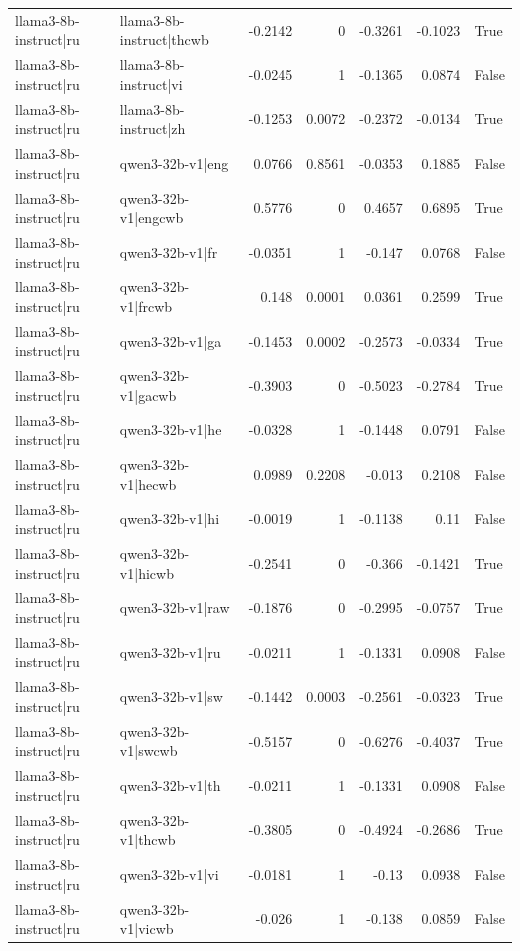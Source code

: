 \begin{table}
\begin{tabular}{l l r r r r l}
llama3-8b-instruct|ru & llama3-8b-instruct|thcwb & -0.2142 & 0 & -0.3261 & -0.1023 & True \\
llama3-8b-instruct|ru & llama3-8b-instruct|vi & -0.0245 & 1 & -0.1365 & 0.0874 & False \\
llama3-8b-instruct|ru & llama3-8b-instruct|zh & -0.1253 & 0.0072 & -0.2372 & -0.0134 & True \\
llama3-8b-instruct|ru & qwen3-32b-v1|eng & 0.0766 & 0.8561 & -0.0353 & 0.1885 & False \\
llama3-8b-instruct|ru & qwen3-32b-v1|engcwb & 0.5776 & 0 & 0.4657 & 0.6895 & True \\
llama3-8b-instruct|ru & qwen3-32b-v1|fr & -0.0351 & 1 & -0.147 & 0.0768 & False \\
llama3-8b-instruct|ru & qwen3-32b-v1|frcwb & 0.148 & 0.0001 & 0.0361 & 0.2599 & True \\
llama3-8b-instruct|ru & qwen3-32b-v1|ga & -0.1453 & 0.0002 & -0.2573 & -0.0334 & True \\
llama3-8b-instruct|ru & qwen3-32b-v1|gacwb & -0.3903 & 0 & -0.5023 & -0.2784 & True \\
llama3-8b-instruct|ru & qwen3-32b-v1|he & -0.0328 & 1 & -0.1448 & 0.0791 & False \\
llama3-8b-instruct|ru & qwen3-32b-v1|hecwb & 0.0989 & 0.2208 & -0.013 & 0.2108 & False \\
llama3-8b-instruct|ru & qwen3-32b-v1|hi & -0.0019 & 1 & -0.1138 & 0.11 & False \\
llama3-8b-instruct|ru & qwen3-32b-v1|hicwb & -0.2541 & 0 & -0.366 & -0.1421 & True \\
llama3-8b-instruct|ru & qwen3-32b-v1|raw & -0.1876 & 0 & -0.2995 & -0.0757 & True \\
llama3-8b-instruct|ru & qwen3-32b-v1|ru & -0.0211 & 1 & -0.1331 & 0.0908 & False \\
llama3-8b-instruct|ru & qwen3-32b-v1|sw & -0.1442 & 0.0003 & -0.2561 & -0.0323 & True \\
llama3-8b-instruct|ru & qwen3-32b-v1|swcwb & -0.5157 & 0 & -0.6276 & -0.4037 & True \\
llama3-8b-instruct|ru & qwen3-32b-v1|th & -0.0211 & 1 & -0.1331 & 0.0908 & False \\
llama3-8b-instruct|ru & qwen3-32b-v1|thcwb & -0.3805 & 0 & -0.4924 & -0.2686 & True \\
llama3-8b-instruct|ru & qwen3-32b-v1|vi & -0.0181 & 1 & -0.13 & 0.0938 & False \\
llama3-8b-instruct|ru & qwen3-32b-v1|vicwb & -0.026 & 1 & -0.138 & 0.0859 & False \\

\end{tabular}
\end{table}
